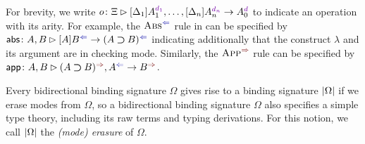 For brevity, we write $o \colon \Xi \rhd [\Delta_1]A_{1}^{\dir{d_1}}, \ldots, [\Delta_{n}] A^{\dir{d_n}}_{n} \to A_0^{\dir{d}}$ to indicate an operation with its arity. 
For example, the $\ChkRule{Abs}$ rule in  can be specified by $\mathsf{abs}\colon A , B \rhd [A]B^{\chk} \to (A \bto B)^{\chk}$ indicating additionally that the construct $\lambda$ and its argument are in checking mode.
Similarly, the $\SynRule{App}$ rule can be specified by $\mathsf{app}\colon A, B \rhd (A \bto B)^{\syn}, A^{\chk} \to B^{\syn}$.

\begin{remark}
  Every bidirectional binding signature $\Omega$ gives rise to a binding signature $\left|\Omega\right|$ if we erase modes from $\Omega$, so a bidirectional binding signature $\Omega$ also specifies a simple type theory, including its raw terms and typing derivations.
  For this notion, we call $\left|\Omega\right|$ the \emph{(mode) erasure} of $\Omega$.
\end{remark}


